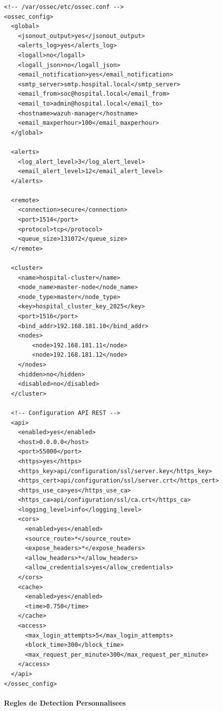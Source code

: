 \begin{lstlisting}[style=xmlstyle,caption=Configuration Wazuh Manager principal]
<!-- /var/ossec/etc/ossec.conf -->
<ossec_config>
  <global>
    <jsonout_output>yes</jsonout_output>
    <alerts_log>yes</alerts_log>
    <logall>no</logall>
    <logall_json>no</logall_json>
    <email_notification>yes</email_notification>
    <smtp_server>smtp.hospital.local</smtp_server>
    <email_from>soc@hospital.local</email_from>
    <email_to>admin@hospital.local</email_to>
    <hostname>wazuh-manager</hostname>
    <email_maxperhour>100</email_maxperhour>
  </global>

  <alerts>
    <log_alert_level>3</log_alert_level>
    <email_alert_level>12</email_alert_level>
  </alerts>

  <remote>
    <connection>secure</connection>
    <port>1514</port>
    <protocol>tcp</protocol>
    <queue_size>131072</queue_size>
  </remote>

  <cluster>
    <name>hospital-cluster</name>
    <node_name>master-node</node_name>
    <node_type>master</node_type>
    <key>hospital_cluster_key_2025</key>
    <port>1516</port>
    <bind_addr>192.168.181.10</bind_addr>
    <nodes>
        <node>192.168.181.11</node>
        <node>192.168.181.12</node>
    </nodes>
    <hidden>no</hidden>
    <disabled>no</disabled>
  </cluster>

  <!-- Configuration API REST -->
  <api>
    <enabled>yes</enabled>
    <host>0.0.0.0</host>
    <port>55000</port>
    <https>yes</https>
    <https_key>api/configuration/ssl/server.key</https_key>
    <https_cert>api/configuration/ssl/server.crt</https_cert>
    <https_use_ca>yes</https_use_ca>
    <https_ca>api/configuration/ssl/ca.crt</https_ca>
    <logging_level>info</logging_level>
    <cors>
      <enabled>yes</enabled>
      <source_route>*</source_route>
      <expose_headers>*</expose_headers>
      <allow_headers>*</allow_headers>
      <allow_credentials>yes</allow_credentials>
    </cors>
    <cache>
      <enabled>yes</enabled>
      <time>0.750</time>
    </cache>
    <access>
      <max_login_attempts>5</max_login_attempts>
      <block_time>300</block_time>
      <max_request_per_minute>300</max_request_per_minute>
    </access>
  </api>
</ossec_config>
\end{lstlisting}

\paragraph{Regles de Detection Personnalisees}

